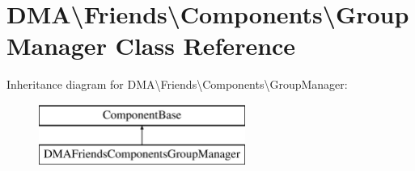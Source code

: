 \hypertarget{classDMA_1_1Friends_1_1Components_1_1GroupManager}{}\section{D\+M\+A\textbackslash{}Friends\textbackslash{}Components\textbackslash{}Group\+Manager Class Reference}
\label{classDMA_1_1Friends_1_1Components_1_1GroupManager}
Inheritance diagram for D\+M\+A\textbackslash{}Friends\textbackslash{}Components\textbackslash{}Group\+Manager\+:\begin{figure}[H]
\begin{center}
\leavevmode
\includegraphics[height=2.000000cm]{d9/d20/classDMA_1_1Friends_1_1Components_1_1GroupManager}
\end{center}
\end{figure}
